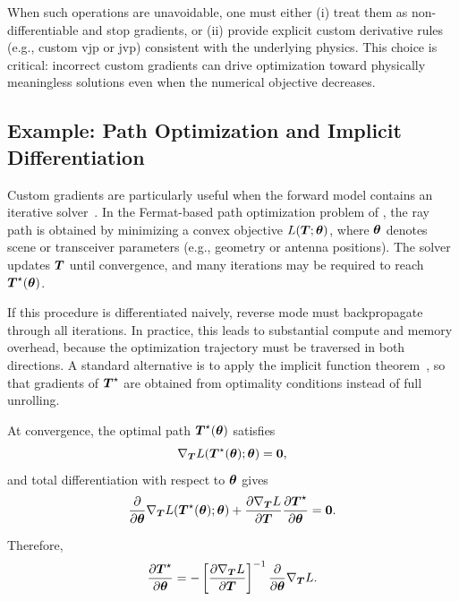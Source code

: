 When such operations are unavoidable, one must either (i) treat them as non-differentiable and stop gradients, or (ii) provide explicit custom derivative rules (e.g., custom \gls{vjp} or \gls{jvp}) consistent with the underlying physics. This choice is critical: incorrect custom gradients can drive optimization toward physically meaningless solutions even when the numerical objective decreases.

\subsection{Example: Path Optimization and Implicit Differentiation}

Custom gradients are particularly useful when the forward model contains an iterative solver~. In the Fermat-based path optimization problem of , the ray path is obtained by minimizing a convex objective $L(\boldsymbol{T};\boldsymbol{\theta})$, where $\boldsymbol{\theta}$ denotes scene or transceiver parameters (e.g., geometry or antenna positions). The solver updates $\boldsymbol{T}$ until convergence, and many iterations may be required to reach $\boldsymbol{T}^\star(\boldsymbol{\theta})$.

If this procedure is differentiated naively, reverse mode must backpropagate through all iterations. In practice, this leads to substantial compute and memory overhead, because the optimization trajectory must be traversed in both directions. A standard alternative is to apply the implicit function theorem~, so that gradients of $\boldsymbol{T}^\star$ are obtained from optimality conditions instead of full unrolling.

At convergence, the optimal path $\boldsymbol{T}^\star(\boldsymbol{\theta})$ satisfies
\begin{equation}
  \nabla_{\boldsymbol{T}} L(\boldsymbol{T}^\star(\boldsymbol{\theta});\boldsymbol{\theta}) = \boldsymbol{0},
\end{equation}
and total differentiation with respect to $\boldsymbol{\theta}$ gives
\begin{equation}
  \frac{\partial}{\partial \boldsymbol{\theta}} \nabla_{\boldsymbol{T}} L(\boldsymbol{T}^\star(\boldsymbol{\theta}); \boldsymbol{\theta}) + \frac{\partial \nabla_{\boldsymbol{T}} L}{\partial \boldsymbol{T}} \frac{\partial \boldsymbol{T}^\star}{\partial \boldsymbol{\theta}} = \boldsymbol{0}.
\end{equation}

Therefore,
\begin{equation}
  \frac{\partial \boldsymbol{T}^\star}{\partial \boldsymbol{\theta}} = -\left[\frac{\partial \nabla_{\boldsymbol{T}} L}{\partial \boldsymbol{T}}\right]^{-1} \frac{\partial}{\partial \boldsymbol{\theta}} \nabla_{\boldsymbol{T}} L.
\end{equation}

